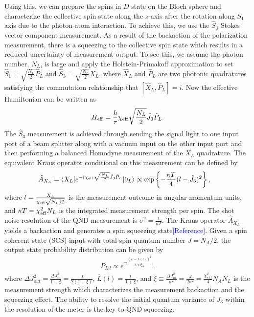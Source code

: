 \documentclass[preprint,aps,pra,onecolumn]{revtex4-1} %
\begin{document}
Using this, we can prepare the spins in $ D $ state on the Bloch sphere and characterize the collective spin state along the $ z $-axis after the rotation along $ S_1 $ axis due to the photon-atom interaction. To achieve this, we use the $ \hat{S}_3 $ Stokes vector component measurement. As a result of the backaction of the polarization measurement, there is a squeezing to the collective spin state which results in a reduced uncertainty of measurement output. To see this, we assume the photon number, $N_L$, is large and apply the Holstein-Primakoff approximation to set $ \hat{S}_1=\sqrt{\frac{N_L}{2}}\hat{P}_L $ and $ \hat{S}_3=\sqrt{\frac{N_L}{2}}\hat{X}_L $, where $ \hat{X}_L$ and $\hat{P}_L $ are two photonic quadratures satisfying the commutation relationship that $ [\hat{X}_L,\hat{P}_L]=i $. Now the effective Hamiltonian can be written as
\begin{align}
H_{\rm eff} = \frac{\hbar}{\tau} \chi_{\rm eff} \sqrt{\frac{N_L}{2}}\hat{J}_3 \hat{P}_L. 
\end{align}
The $ \hat{S}_3 $ measurement is achieved through sending the signal light to one input port of a beam splitter along with a vacuum input on the other input port and then performing a balanced Homodyne measurement of the $ X_L $ quadrature. The equivalent Kraus operator conditional on this measurement can be defined by 
\begin{align}
\hat{A}_{X_L} &= \langle{X_L}\rvert e^{-i\chi_{\rm eff} \sqrt{\frac{N_L}{2}}\hat{J}_3 \hat{P}_L} \lvert{0_L}\rangle\propto \exp\left\{ -\frac{\kappa T}{4}(l-\hat{J}_3)^2 \right\},
\end{align} 
where $ l=\frac{X_L}{\chi_{\rm eff} \sqrt{N_L/2}} $ is the measurement outcome in angular momentum units, and $ \kappa T=\chi_{\rm eff}^2N_L $ is the integrated measurement strength per spin. The shot noise resolution of the QND measurement is $ \sigma^2=\frac{1}{\kappa T} $. The Kraus operator $\hat{A}_{X_L}$ yields a backaction and generates a spin squeezing state\textcolor{blue}{[Reference]}. Given a spin coherent state (SCS) input with total spin quantum number $ J=N_A/2 $, the output state probability distribution can be given by 
\begin{align}
P_{L|l} \propto e^{-\frac{(L-\bar{L}(l))^2}{2\Delta J_{out}^2}},
\end{align}
where $ \Delta J_{out}^2 =\frac{\Delta J_{in}^2}{1+\xi}=\frac{J}{2(1+\xi)} $, $ \bar{L}(l)=\frac{l}{1+\xi} $, and $ \xi\equiv \frac{\Delta J_{in}^2}{\sigma^2}=\frac{J}{2\sigma^2}=\frac{\chi_{e\!f\!f}^2}{4}N_AN_L $ is the measurement strength which characterizes the measurement backaction and the squeezing effect. The ability to resolve the initial quantum variance of $ J_3 $ within the resolution of the meter is the key to QND squeezing.
\end{document}
